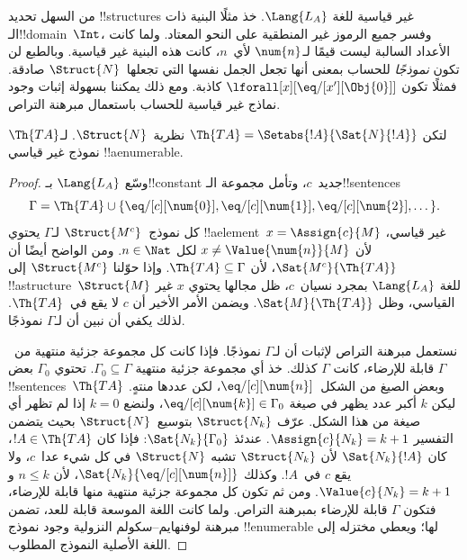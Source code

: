 \documentclass[../../../include/open-logic-section]{subfiles}
\begin{document}
\begin{explain}
من السهل تحديد !!{structure}s غير قياسية للغة $\Lang{L_A}$. خذ مثلًا
البنية ذات الـ!!{domain}~$\Int$، وفسر جميع الرموز غير المنطقية على النحو
المعتاد. ولما كانت الأعداد السالبة ليست قيمًا لـ$\num{n}$ لأي~$n$، كانت
هذه البنية غير قياسية. وبالطبع لن تكون \emph{نموذجًا} للحساب بمعنى أنها
تجعل الجمل نفسها التي تجعلها~$\Struct{N}$ صادقة. فمثلًا تكون
$\lforall[x][\eq/[x'][\Obj{0}]]$ كاذبة. ومع ذلك يمكننا بسهولة إثبات وجود
نماذج غير قياسية للحساب باستعمال مبرهنة التراص.
\end{explain}

\begin{prop}
لتكن $\Th{TA} = \Setabs{!A}{\Sat{N}{!A}}$ نظرية~$\Struct{N}$.
لـ$\Th{TA}$ نموذج غير قياسي !!a{enumerable}.
\end{prop}

\begin{proof}
وسّع $\Lang{L_A}$ بـ!!{constant} جديد~$c$، وتأمل مجموعة الـ!!{sentence}s
\[
\Gamma = \Th{TA} \cup \{\eq/[c][\num{0}], \eq/[c][\num{1}],
\eq/[c][\num{2}], \dots\}.
\]
كل نموذج~$\Struct{M^c}$ لـ$\Gamma$ يحتوي !!a{element}~$x =
\Assign{c}{M}$ غير قياسي، لأن $x \neq \Value{\num{n}}{M}$ لكل
$n \in \Nat$. ومن الواضح أيضًا أن $\Sat{M^c}{\Th{TA}}$، لأن
$\Th{TA} \subseteq \Gamma$. وإذا حوّلنا $\Struct{M^c}$ إلى
!!a{structure}~$\Struct{M}$ للغة $\Lang{L_A}$ بمجرد نسيان~$c$، ظل
مجالها يحتوي $x$ غير القياسي، وظل $\Sat{M}{\Th{TA}}$. ويضمن الأمر
الأخير أن $c$ لا يقع في~$\Th{TA}$. لذلك يكفي أن نبين أن لـ$\Gamma$
نموذجًا.

نستعمل مبرهنة التراص لإثبات أن لـ$\Gamma$ نموذجًا. فإذا كانت كل مجموعة
جزئية منتهية من~$\Gamma$ قابلة للإرضاء، كانت $\Gamma$ كذلك. خذ أي
مجموعة جزئية منتهية $\Gamma_0 \subseteq \Gamma$. تحتوي $\Gamma_0$ بعض
!!{sentence}s~$\Th{TA}$ وبعض الصيغ من الشكل~$\eq/[c][\num{n}]$، لكن
عددها منتهٍ. ليكن $k$ أكبر عدد يظهر في صيغة
$\eq/[c][\num{k}] \in \Gamma_0$، ولنضع $k=0$ إذا لم تظهر أي صيغة من
هذا الشكل. عرّف $\Struct{N_k}$ بتوسيع~$\Struct{N}$ بحيث يتضمن التفسير
$\Assign{c}{N_k}=k+1$. عندئذ $\Sat{N_k}{\Gamma_0}$: فإذا كان
$!A \in \Th{TA}$، كان $\Sat{N_k}{!A}$ لأن $\Struct{N_k}$ تشبه
$\Struct{N}$ في كل شيء عدا~$c$، ولا يقع $c$ في~$!A$. وكذلك
$\Sat{N_k}{\eq/[c][\num{n}]}$، لأن $n \le k$ و
$\Value{c}{N_k}=k+1$. ومن ثم تكون كل مجموعة جزئية منتهية منها قابلة
للإرضاء، فتكون $\Gamma$ قابلة للإرضاء بمبرهنة التراص. ولما كانت
اللغة الموسعة قابلة للعد، تضمن مبرهنة لوفنهايم--سكولم النزولية وجود نموذج
!!{enumerable} لها؛ ويعطي مختزله إلى اللغة الأصلية النموذج المطلوب.
\end{proof}
\end{document}
